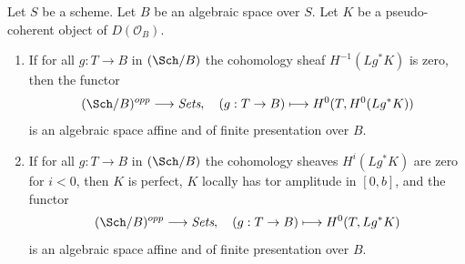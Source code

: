 \begin{lemma}
\label{lemma-cohomology-perfect-complex}
Let $S$ be a scheme. Let $B$ be an algebraic space over $S$.
Let $K$ be a pseudo-coherent object of $D(\mathcal{O}_B)$.
\begin{enumerate}
\item If for all $g : T \to B$ in $(\Sch/B)$ the cohomology sheaf
$H^{-1}(Lg^*K)$ is zero, then the functor
$$
(\Sch/B)^{opp} \longrightarrow \textit{Sets},\quad
(g : T \to B) \longmapsto H^0(T, H^0(Lg^*K))
$$
is an algebraic space affine and of finite presentation over $B$.
\item If for all $g : T \to B$ in $(\Sch/B)$ the cohomology sheaves
$H^i(Lg^*K)$ are zero for $i < 0$, then $K$ is perfect,
$K$ locally has tor amplitude in $[0, b]$, and the functor
$$
(\Sch/B)^{opp} \longrightarrow \textit{Sets},\quad
(g : T \to B) \longmapsto H^0(T, Lg^*K)
$$
is an algebraic space affine and of finite presentation over $B$.
\end{enumerate}
\end{lemma}

